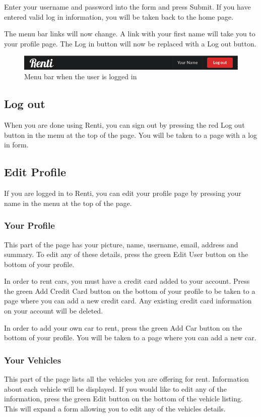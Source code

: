 \documentclass{article}
\begin{document}
Enter your username and password into the form and press Submit. If you have entered valid log in information, you will be taken back to the home page.

The menu bar links will now change. A link with your first name will take you to your profile page. The Log in button will now be replaced with a Log out button.

\begin{figure}[ht!]
    \centering
    \includegraphics[keepaspectratio, width=\textwidth]{menubarloggedin}
    \caption{Menu bar when the user is logged in}
    \label{fig:menubarloggedin}
\end{figure}

\subsection{Log out}
When you are done using Renti, you can sign out by pressing the red Log out button in the menu at the top of the page. You will be taken to a page with a log in form.

\subsection{Edit Profile}
If you are logged in to Renti, you can edit your profile page by pressing your name in the menu at the top of the page.

\subsubsection{Your Profile}
This part of the page has your picture, name, username, email, address and summary. To edit any of these details, press the green Edit User button on the bottom of your profile.

In order to rent cars, you must have a credit card added to your account. Press the green Add Credit Card button on the bottom of your profile to be taken to a page where you can add a new credit card. Any existing credit card information on your account will be deleted.

In order to add your own car to rent, press the green Add Car button on the bottom of your profile. You will be taken to a page where you can add a new car.

\subsubsection{Your Vehicles}
This part of the page lists all the vehicles you are offering for rent. Information about each vehicle will be displayed. If you would like to edit any of the information, press the green Edit button on the bottom of the vehicle listing. This will expand a form allowing you to edit any of the vehicles details.
\end{document}
